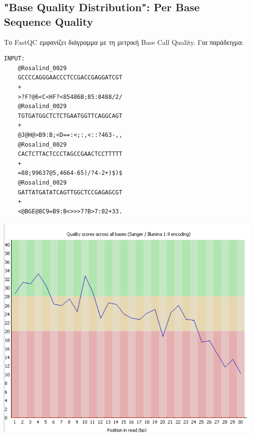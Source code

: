     \subsection{"Base Quality Distribution": Per Base Sequence Quality}
        Το FastQC \cite{FastQC} εμφανίζει διάγραμμα με τη μετρική Base Call Quality. Για παράδειγμα:
    \begin{graycomment} \footnotesize
         \begin{multicols}{2} \centering
             \begin{verbatim}
INPUT:
    @Rosalind_0029
    GCCCCAGGGAACCCTCCGACCGAGGATCGT
    +
    >?F?@6<C<HF?<85486B;85:8488/2/
    @Rosalind_0029
    TGTGATGGCTCTCTGAATGGTTCAGGCAGT
    +
    @J@H@>B9:B;<D==:<;:,<::?463-,,
    @Rosalind_0029
    CACTCTTACTCCCTAGCCGAACTCCTTTTT
    +
    =88;99637@5,4664-65)/?4-2+)$)$
    @Rosalind_0029
    GATTATGATATCAGTTGGCTCCGAGAGCGT
    +
    <@BGE@8C9=B9:B<>>>7?B>7:02+33.
             \end{verbatim}
        \end{multicols}
    \end{graycomment}

    \begin{center} \noindent
        \includegraphics[scale=0.5]{img/Per Base Sequence Quality}
    \end{center}

